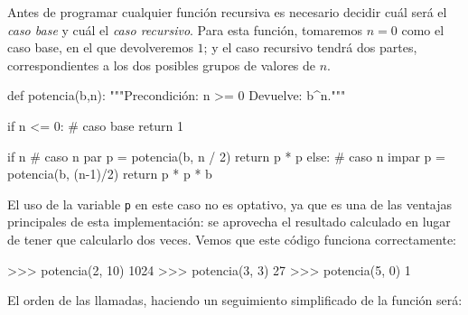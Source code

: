 Antes de programar cualquier función recursiva es necesario decidir cuál
será el {\it caso base} y cuál el {\it caso recursivo}.  Para esta función,
tomaremos $n=0$ como el caso base, en el que devolveremos $1$; y el caso
recursivo tendrá dos partes, correspondientes a los dos posibles grupos de
valores de $n$.

\begin{codigo-python-sn}
def potencia(b,n):
    """Precondición: n >= 0
       Devuelve: b^n."""

    if n <= 0:
        # caso base
        return 1

    if n %
        # caso n par
        p = potencia(b, n / 2)
        return p * p
    else:
        # caso n impar
        p = potencia(b, (n-1)/2)
        return p * p * b
\end{codigo-python-sn}

El uso de la variable \lstinline!p! en este caso no es optativo, ya que
es una de las ventajas principales de esta implementación: se aprovecha el
resultado calculado en lugar de tener que calcularlo dos veces. Vemos que
este código funciona correctamente:

\begin{codigo-python-sn}
>>> potencia(2, 10)
1024
>>> potencia(3, 3)
27
>>> potencia(5, 0)
1
\end{codigo-python-sn}

El orden de las llamadas, haciendo un seguimiento simplificado de la
función será:

